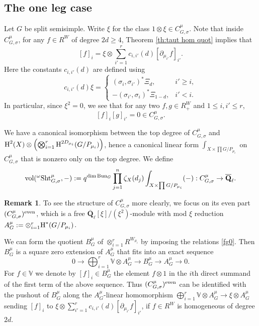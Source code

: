 \documentclass[reqno]{amsart}
\numberwithin{equation}{subsection}
\theoremstyle{definition}
\newtheorem{remark}[subsubsection]{Remark}
\def\VV{\mathbb{V}}
\newcommand{\Bun}{\textup{Bun}}
\newcommand{\even}{\textup{even}}
\newcommand\Sht{\textup{Sht}}
\newcommand{\vol}{\textup{vol}}
\newcommand{\Qlbar}{\overline{\Q}_\ell}
\newcommand\ot{\otimes}
\newcommand{\cohog}[2]{\textup{H}^{#1}({#2})}     %
\newcommand{\s}{\sigma}
\newcommand{\z}{\zeta}
\newcommand{\om}{\omega}
\newcommand\pl{\partial}
\newcommand{\Q}{\mathbf{Q}}
\begin{document}
\subsection{The one leg case}
Let $G$ be split semisimple. Write $\xi$ for the class $1\ot \xi\in C^\mu_{G,\s}$. Note that inside $C^\mu_{G,\s}$, for any $f\in R^W$ of degree $2d\ge4$, Theorem \ref{th:taut hom quot} implies that  
\begin{equation}\label{rel C sig}
    [f]_i=\xi\ot \sum_{i'=1}^r c_{i,i'}(d)[\pl_{\mu_{i'}}f]_{i'}.
\end{equation}
Here the constants $c_{i,i'}(d)$ are defined using
\begin{equation}\label{eq: c(d)}
    c_{i,i'}(d)\xi=\begin{cases}
        (\s_i,\s_{i'})^*\Xi_d, & i'\ge i,\\
        -(\s_{i'}, \s_{i})^*\Xi_{1-d}, & i'<i.
    \end{cases}
\end{equation}
In particular, since $\xi^2 = 0$, we see that for any two $f,g\in R^W_+$ and $1\le i,i'\le r$,
\begin{equation}\label{fg0}
    [f]_i[g]_{i'}=0\in C^\mu_{G,\s}.
\end{equation}

We have a canonical isomorphism between the top degree of $C^\mu_{G,\s}$ and $\cohog{2}{X}\ot \left(\bigotimes_{i=1}^r\cohog{2D_{\mu_i}}{G/P_{\mu_i}}\right)$, hence a canonical linear form $\int_{X\times \prod G/P_{\mu_i}}$ on $C^\mu_{G,\s}$ that is nonzero only on the top degree. We define 
\begin{equation*}   \vol({}^\om\Sht^\mu_{G,\s}, -) :=q^{\dim\Bun_G}\prod_{j=1}^n\z_X(d_j)\int_{X\times \prod G/P_{\mu_i}}(-): C^\mu_{G,\s}\to \Qlbar.
\end{equation*}


\begin{remark}
    To see the structure of $C^{\mu}_{G,\s}$ more clearly, we focus on its even part $(C^{\mu}_{G,\s})^\even$, which is a free $\Qlbar[\xi]/(\xi^2)$-module with mod $\xi$ reduction $A^\mu_G:=\ot_{i=1}^r\cohog{*}{G/P_{\mu_i}}$.

    We can form the quotient $B^{\mu}_{G}$ of $\otimes_{i=1}^rR^{W_{\mu_i}}$ by imposing the relations \eqref{fg0}. Then $B^{\mu}_{G}$ is a square zero extension of $A^\mu_G$ that fits into an exact sequence
    \begin{equation*}
        0\to \bigoplus_{i=1}^r\VV\ot A^\mu_G\to B^\mu_{G}\to A^\mu_G\to 0.
    \end{equation*}
    For $f\in \VV$ we denote by $[f]_i\in B^\mu_G$ the element $f\ot 1$ in the $i$th direct summand of the first term of the above sequence. Thus $(C^{\mu}_{G,\s})^\even$ can be identified with the pushout of $B^\mu_G$ along the $A^\mu_G$-linear homomorphism $\bigoplus_{i=1}^r\VV\ot A^\mu_G\to \xi\ot A^\mu_G$ sending $[f]_i$ to $\xi\ot \sum_{i'=1}^r c_{i,i'}(d)[\pl_{\mu_{i'}}f]_{i'}$, if $f\in R^W$ is homogeneous of degree $2d$.
\end{remark}
\end{document}
